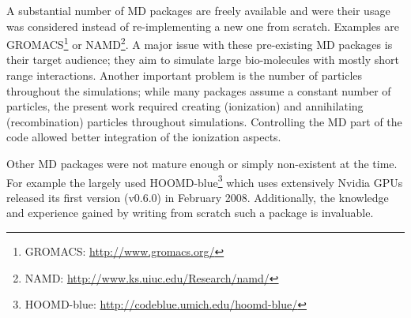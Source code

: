 A substantial number of MD packages are freely available and were
their usage was considered instead of re-implementing a new one from scratch.
Examples are GROMACS\footnote{GROMACS:
\url{http://www.gromacs.org/}} or NAMD\footnote{NAMD:
\url{http://www.ks.uiuc.edu/Research/namd/}}. A major issue with these
pre-existing MD packages is their target audience; they aim to simulate large
bio-molecules with mostly short range interactions. Another important problem
is the number of particles throughout the simulations; while many packages
assume a constant number of particles, the present work required creating
(ionization) and annihilating (recombination) particles throughout simulations.
Controlling the MD part of the code allowed better integration of the
ionization aspects.

Other MD packages were not mature enough or simply non-existent at the time.
For example the largely used HOOMD-blue\footnote{HOOMD-blue:
\url{http://codeblue.umich.edu/hoomd-blue/}} which uses extensively
Nvidia GPUs released its first version (v0.6.0) in February 2008.
Additionally, the knowledge and experience gained by writing from scratch such
a package is invaluable.




